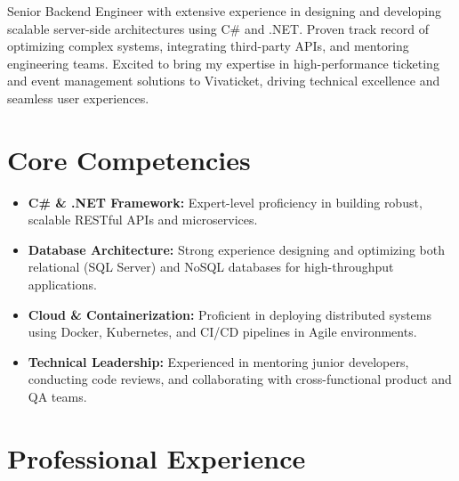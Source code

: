 \documentclass[11pt,a4paper,sans]{moderncv}
\begin{document}
\makecvtitle

\vspace{-15pt}
Senior Backend Engineer with extensive experience in designing and developing scalable server-side architectures using C\# and .NET. Proven track record of optimizing complex systems, integrating third-party APIs, and mentoring engineering teams. Excited to bring my expertise in high-performance ticketing and event management solutions to Vivaticket, driving technical excellence and seamless user experiences.

\section{Core Competencies}
\vspace{1pt}
\begin{itemize}
\item \textbf{C\# \& .NET Framework:} Expert-level proficiency in building robust, scalable RESTful APIs and microservices.
\item \textbf{Database Architecture:} Strong experience designing and optimizing both relational (SQL Server) and NoSQL databases for high-throughput applications.
\item \textbf{Cloud \& Containerization:} Proficient in deploying distributed systems using Docker, Kubernetes, and CI/CD pipelines in Agile environments.
\item \textbf{Technical Leadership:} Experienced in mentoring junior developers, conducting code reviews, and collaborating with cross-functional product and QA teams.
\end{itemize}

\section{Professional Experience}
\vspace{1pt}

\vspace{3pt}
\end{document}
